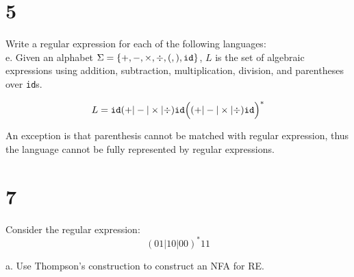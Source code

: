 \documentclass[11pt]{article}
\begin{document}
\newpage

\section*{5}
Write a regular expression for each of the following languages: \\ 

e. Given an alphabet $\Sigma = \{+, -, \times, \div, (,), \verb|id|\}$, $L$ is the set of algebraic expressions using addition, subtraction, multiplication, division, and parentheses over \verb|id|s.

\begin{Answer}
$$L = \verb|id|(+ | - | \times | \div)\verb|id|\Big((+ | - | \times | \div)\verb|id|\Big)^*$$

An exception is that parenthesis cannot be matched with regular expression, thus the language cannot be fully represented by regular expressions.
\end{Answer}

\newpage

\section*{7}
Consider the regular expression:
$$(01 | 10 | 00)^* 11$$

a. Use Thompson's construction to construct an NFA for RE. 
\end{document}
